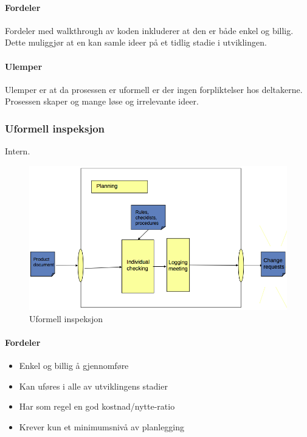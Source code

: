 \paragraph{Fordeler}

Fordeler med walkthrough av koden inkluderer at den er både enkel og
billig. Dette muliggjør at en kan samle ideer på et tidlig stadie i
utviklingen.

\paragraph{Ulemper}

Ulemper er at da prosessen er uformell er der ingen forpliktelser hos
deltakerne. Prosessen skaper og mange løse og irrelevante ideer.

\subsubsection{Uformell inspeksjon}

Intern.

\begin{figure}[htbp]
\centering
\includegraphics{Forelesning 05/img/1.png}
\caption{Uformell inspeksjon}
\end{figure}

\paragraph{Fordeler}

\begin{itemize}
\item
  Enkel og billig å gjennomføre
\item
  Kan uføres i alle av utviklingens stadier
\item
  Har som regel en god kostnad/nytte-ratio
\item
  Krever kun et minimumsnivå av planlegging
\end{itemize}
